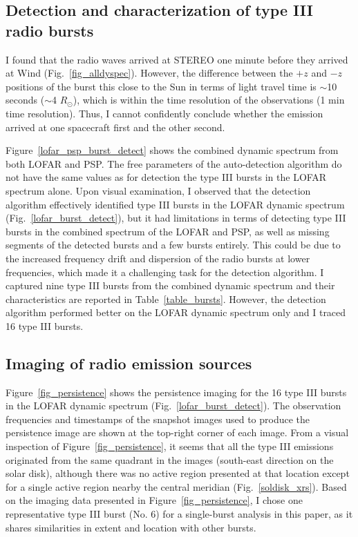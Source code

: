 \subsection{Detection and characterization of type III radio bursts}
I found that the radio waves arrived at STEREO one minute before they arrived at Wind (Fig.~\ref{fig_alldyspec}). However, the difference between the $+z$ and $-z$ positions of the burst this close to the Sun in terms of light travel time is $\sim$10 seconds ($\sim$4 $R_\odot$), which is within the time resolution of the observations (1 min time resolution). Thus, I cannot confidently conclude whether the emission arrived at one spacecraft first and the other second.

Figure~\ref{lofar_psp_burst_detect} shows the combined dynamic spectrum from both LOFAR and PSP. The free parameters of the auto-detection algorithm do not have the same values as for detection the type III bursts in the LOFAR spectrum alone.
Upon visual examination, I observed that the detection algorithm effectively identified type III bursts in the LOFAR dynamic spectrum (Fig.~\ref{lofar_burst_detect}), but it had limitations in terms of detecting type III bursts in the combined spectrum of the LOFAR and PSP, as well as missing segments of the detected bursts and a few bursts entirely.
This could be due to the increased frequency drift and dispersion of the radio bursts at lower frequencies, which made it a challenging task for the detection algorithm.
I captured nine type III bursts from the combined dynamic spectrum and their characteristics are reported in Table~\ref{table_bursts}.
However, the detection algorithm performed better on the LOFAR dynamic spectrum only and I traced 16 type III bursts.

\subsection{Imaging of radio emission sources}
Figure~\ref{fig_persistence} shows the persistence imaging for the 16 type III bursts in the LOFAR dynamic spectrum (Fig.~\ref{lofar_burst_detect}). The observation frequencies and timestamps of the snapshot images used to produce the persistence image are shown at the top-right corner of each image.
From a visual inspection of Figure~\ref{fig_persistence}, it seems that all the type III emissions originated from the same quadrant in the images (south-east direction on the solar disk), although there was no active region presented at that location except for a single active region nearby the central meridian (Fig.~\ref{soldisk_xrs}).
Based on the imaging data presented in Figure~\ref{fig_persistence}, I chose one representative type III burst (No. 6) for a single-burst analysis in this paper, as it shares similarities in extent and location with other bursts.


